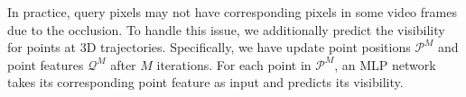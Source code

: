 In practice, query pixels may not have corresponding pixels in some video frames due to the occlusion.
To handle this issue, we additionally predict the visibility for points at 3D trajectories.
Specifically, we have update point positions $\mathcal{P}^M$ and point features $\mathcal{Q}^M$ after $M$ iterations.
For each point in $\mathcal{P}^M$, an MLP network takes its corresponding point feature as input and predicts its visibility.




